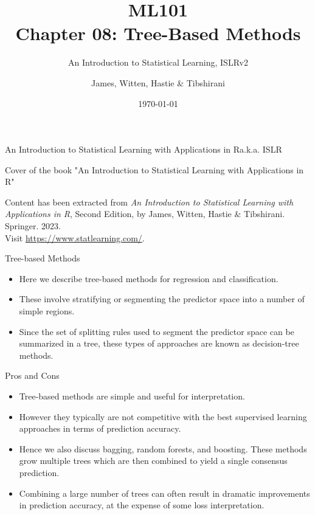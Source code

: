 \documentclass[aspectratio=169, 11pt]{beamer}
\title[Tree-Based Methods]{ML101 \\ Chapter 08: Tree-Based Methods}
\subtitle{An Introduction to Statistical Learning, ISLRv2}
\author{James, Witten, Hastie \& Tibshirani}
\date{\today}
\begin{document}
\frame{\titlepage}

\begin{frame}{An Introduction to Statistical Learning with Applications in R}{a.k.a. ISLR}
    \centering
    \begin{tcolorbox}[colback=LightGray,title=Figure]
    Cover of the book "An Introduction to Statistical Learning with Applications in R"
    \end{tcolorbox}
    \vspace{4mm}
    {
        \tiny
        Content has been extracted from \textit{An Introduction to Statistical Learning with Applications in R}, Second Edition, by James, Witten, Hastie \& Tibshirani. Springer. 2023.\\
        Visit \url{https://www.statlearning.com/}.\\
    }
\end{frame}

\begin{frame}{Tree-based Methods}
\begin{itemize}
    \item Here we describe tree-based methods for regression and classification.
    \item These involve stratifying or segmenting the predictor space into a number of simple regions.
    \item Since the set of splitting rules used to segment the predictor space can be summarized in a tree, these types of approaches are known as decision-tree methods.
\end{itemize}
\end{frame}

\begin{frame}{Pros and Cons}
\begin{itemize}
    \item Tree-based methods are simple and useful for interpretation.
    \item However they typically are not competitive with the best supervised learning approaches in terms of prediction accuracy.
    \item Hence we also discuss bagging, random forests, and boosting. These methods grow multiple trees which are then combined to yield a single consensus prediction.
    \item Combining a large number of trees can often result in dramatic improvements in prediction accuracy, at the expense of some loss interpretation.
\end{itemize}
\end{frame}
\end{document}
